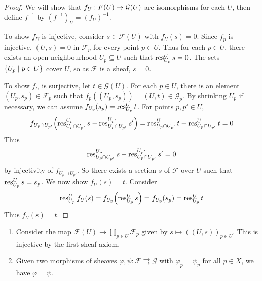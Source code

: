 \begin{proof}
    We will show that \( f_U : \mathcal \mathcal F(U) \to \mathcal G(U) \) are isomorphisms for each \( U \), then define \( f^{-1} \) by \( (f^{-1})_U = (f_U)^{-1} \).

    To show \( f_U \) is injective, consider \( s \in \mathcal F(U) \) with \( f_U(s) = 0 \).
    Since \( f_p \) is injective, \( (U, s) = 0 \) in \( \mathcal F_p \) for every point \( p \in U \).
    Thus for each \( p \in U \), there exists an open neighbourhood \( U_p \subseteq U \) such that \( \operatorname{res}^U_{U_p} s = 0 \).
    The sets \( \qty{U_p \mid p \in U} \) cover \( U \), so as \( \mathcal F \) is a sheaf, \( s = 0 \).

    To show \( f_U \) is surjective, let \( t \in \mathcal G(U) \).
    For each \( p \in U \), there is an element \( (U_p, s_p) \in \mathcal F_p \) such that \( f_p((U_p, s_p)) = (U, t) \in \mathcal G_p \).
    By shrinking \( U_p \) if necessary, we can assume \( f_{U_p}(s_p) = \operatorname{res}^U_{U_p} t \).
    For points \( p, p' \in U \),
    \[ f_{U_p \cap U_{p'}} \qty(\operatorname{res}^{U_p}_{U_p \cap U_{p'}} s - \operatorname{res}^{U_{p'}}_{U_p \cap U_{p'}} s') = \operatorname{res}^U_{U_p \cap U_{p'}} t - \operatorname{res}^U_{U_p \cap U_{p'}} t = 0 \]
    Thus
    \[ \operatorname{res}^{U_p}_{U_p \cap U_{p'}} s - \operatorname{res}^{U_{p'}}_{U_p \cap U_{p'}} s' = 0 \]
    by injectivity of \( f_{U_p \cap U_{p'}} \).
    So there exists a section \( s \) of \( \mathcal F \) over \( U \) such that \( \operatorname{res}^U_{U_p} s = s_p \).
    We now show \( f_U(s) = t \).
    Consider
    \[ \operatorname{res}^U_{U_p} f_U(s) = f_{U_p}\qty(\operatorname{res}^U_{U_p} s) = f_{U_p}(s_p) = \operatorname{res}^U_{U_p} t \]
    Thus \( f_U(s) = t \).
\end{proof}
\begin{remark}
    \begin{enumerate}
        \item Consider the map \( \mathcal F(U) \to \prod_{p \in U} \mathcal F_p \) given by \( s \mapsto ((U, s))_{p \in U} \).
        This is injective by the first sheaf axiom.
        \item Given two morphisms of sheaves \( \varphi, \psi : \mathcal F \rightrightarrows \mathcal G \) with \( \varphi_p = \psi_p \) for all \( p \in X \), we have \( \varphi = \psi \).
    \end{enumerate}
\end{remark}

